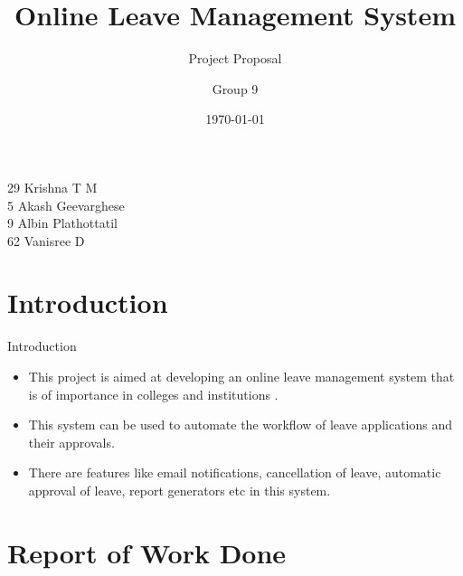 \documentclass[default]{beamer}
\title[OLM]{Online Leave Management System}
\subtitle{Project Proposal}
\date{\today}
\author[Group 9]{Group 9}
\institute[MEC]{Govt. Model Engineering College,Thrikakkara}
\begin{document}
		
	\begin{frame}  %
		\titlepage
		\begin{flushright}
		\small{29 Krishna T M\\5 Akash Geevarghese\\9 Albin Plathottatil\\62 Vanisree D}
		\end{flushright}
	\end{frame}
	
	\section{Introduction} %
	
		\begin{frame}{Introduction}
		\begin{itemize}
	    \item This project is aimed at developing an online leave management system that is of importance in colleges and institutions .
		\item This system can be used to automate the workflow of leave applications and their approvals.
		\item There are features like email notifications,
cancellation of leave, automatic approval of leave, report generators etc in this system.	
		\end{itemize}				
		\end{frame}			
	
	
	\section{Report of Work Done} %
\end{document}
